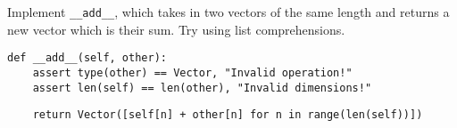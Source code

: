 \question Implement {\tt \_\_add\_\_}, which takes in two vectors of
the same length and returns a new vector which is their sum. Try using
list comprehensions.
\begin{lstlisting}
def __add__(self, other):
    assert type(other) == Vector, "Invalid operation!"
    assert len(self) == len(other), "Invalid dimensions!"
\end{lstlisting}
\begin{solution}[3cm]
\begin{lstlisting}
    return Vector([self[n] + other[n] for n in range(len(self))])
\end{lstlisting}
\end{solution}
